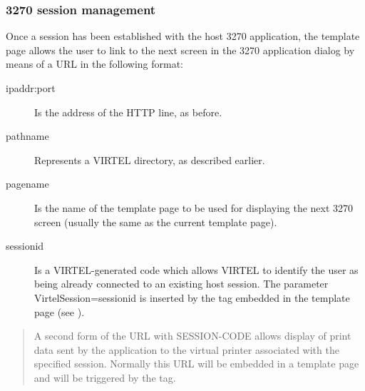 \documentclass[letterpaper,10pt,english]{sphinxmanual}
\begin{document}
\subsubsection{3270 session management}
\label{\detokenize{User_Guide:session-management}}\label{\detokenize{User_Guide:v457ug-session-management}}

Once a session has been established with the host 3270 application, the template page allows the user to link to the next screen in the 3270 application dialog by means of a URL in the following format:

\begin{sphinxVerbatim}[commandchars=\\\{\}]
\end{sphinxVerbatim}
\begin{description}
\item[{ipaddr:port}] \leavevmode
Is the address of the HTTP line, as before.

\item[{pathname}] \leavevmode
Represents a VIRTEL directory, as described earlier.

\item[{pagename}] \leavevmode
Is the name of the template page to be used for displaying the next
3270 screen (usually the same as the current template page).

\item[{sessionid}] \leavevmode
Is a VIRTEL-generated code which allows VIRTEL to identify the user as being already connected to an existing host session. The parameter VirtelSession=sessionid is inserted by the
 tag embedded in the template page (see {\hyperref[\detokenize{User_Guide:v457ug-session-context-mangement}]{}}).

\end{description}

\begin{quote}

A second form of the URL with SESSION-CODE allows display of print data sent by the application to the virtual printer associated with the specified session. Normally this URL will be embedded in a
template page and will be triggered by the  tag.
\end{quote}
\end{document}
